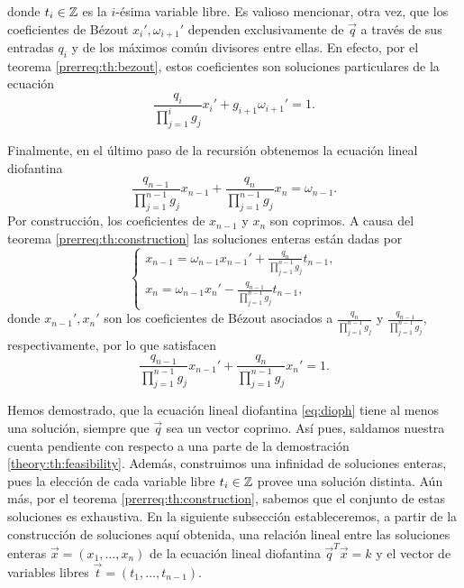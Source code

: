 donde $t_i \in \mathbb{Z}$ es la $i$-ésima variable libre. Es valioso mencionar, otra vez, que los
coeficientes de Bézout $x_i', \omega_{i+1}'$ dependen exclusivamente de $\vec{q}$ a través de sus
entradas $q_i$ y de los máximos común divisores entre ellas. En efecto, por el teorema
\ref{prerreq:th:bezout}, estos coeficientes son soluciones particulares de la ecuación
\begin{equation}
	\label{dummy:eq:bez-eq}
	\frac{q_i}{\prod_{j=1}^{i}g_j}x_i' + g_{i+1}\omega_{i+1}' = 1.
\end{equation}

Finalmente, en el último paso de la recursión obtenemos la ecuación lineal diofantina
\begin{equation}
	\label{eq:last-equation}
	\frac{q_{n-1}}{\prod_{j=1}^{n-1}g_j}x_{n-1} +
	\frac{q_{n}}{\prod_{j=1}^{n-1}g_j}x_n
	= \omega_{n-1}.
\end{equation}
Por construcción, los coeficientes de $x_{n - 1}$ y $x_n$ son coprimos. A causa del teorema
\ref{prerreq:th:construction} las soluciones enteras están dadas por
\begin{equation}
	\label{eq:last-solution}
	\begin{cases}
		x_{n-1} = \omega_{n-1}x_{n-1}' + \frac{q_n}{\prod_{j=1}^{n-1}g_j}t_{n-1}, \\
		x_n = \omega_{n-1}x_n' - \frac{q_{n-1}}{\prod_{j=1}^{n-1}g_j}t_{n-1},
	\end{cases}
\end{equation}
donde $x_{n-1}', x_n'$ son los coeficientes de Bézout asociados a
$\frac{q_n}{\prod_{j=1}^{n-1}g_j}$ y $\frac{q_{n-1}}{\prod_{j=1}^{n-1}g_j}$,
respectivamente, por lo que satisfacen
\begin{equation}
	\label{eq:last-equation-bez}
	\frac{q_{n-1}}{\prod_{j=1}^{n-1}g_j}x_{n-1}' +
	\frac{q_{n}}{\prod_{j=1}^{n-1}g_j}x_n'
	= 1.
\end{equation}

Hemos demostrado, que la ecuación lineal diofantina \eqref{eq:dioph} tiene al menos una solución,
siempre que $\vec{q}$ sea un vector coprimo. Así pues, saldamos nuestra cuenta pendiente con
respecto a una parte de la demostración \ref{theory:th:feasibility}. Además, construimos una
infinidad de soluciones enteras, pues la elección de cada variable libre $t_i \in \mathbb{Z}$ provee una
solución distinta. Aún más, por el teorema \ref{prerreq:th:construction}, sabemos que el conjunto de
estas soluciones es exhaustiva. En la siguiente subsección estableceremos, a partir de
la construcción de soluciones aquí obtenida, una relación lineal entre las soluciones enteras
$\vec{x} = (x_1, \ldots, x_n)$ de la ecuación lineal diofantina $\vec{q}^T\vec{x} = k$ y el vector
de variables libres $\vec{t} = (t_1, \ldots, t_{n-1})$.

